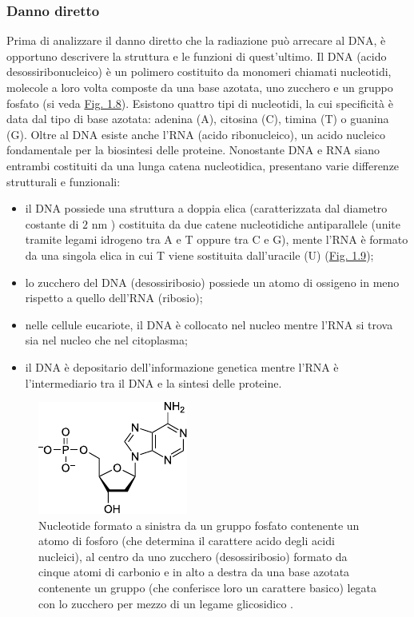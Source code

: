 \documentclass[12pt,a4paper,twoside]{report}
\begin{document}
	\subsubsection{Danno diretto}\label{par:danno_diretto}
	Prima di analizzare il danno diretto che la radiazione può arrecare al DNA, è opportuno descrivere la struttura e le funzioni di quest'ultimo. Il DNA (acido desossiribonucleico) è un polimero costituito da monomeri chiamati nucleotidi, molecole a loro volta composte da una base azotata, uno zucchero e un gruppo fosfato (si veda \hyperref[fig:nucleotide]{Fig. 1.8}). Esistono quattro tipi di nucleotidi, la cui specificità è data dal tipo di base azotata: adenina (A), citosina (C), timina (T) o guanina (G). Oltre al DNA esiste anche l'RNA (acido ribonucleico), un acido nucleico fondamentale per la biosintesi delle proteine. Nonostante DNA e RNA siano entrambi costituiti da una lunga catena nucleotidica, presentano varie differenze strutturali e funzionali:
	\begin{itemize}
		\item il DNA possiede una struttura a doppia elica (caratterizzata dal diametro costante di $2\mbox{ nm}$ \cite{campbell3anno}) costituita da due catene nucleotidiche antiparallele (unite tramite legami idrogeno tra A e T oppure tra C e G), mente l'RNA è formato da una singola elica in cui T viene sostituita dall'uracile (U) (\hyperref[fig:dna_structure]{Fig. 1.9});
		\item lo zucchero del DNA (desossiribosio) possiede un atomo di ossigeno in meno rispetto a quello dell'RNA (ribosio);
		\item nelle cellule eucariote, il DNA è collocato nel nucleo mentre l'RNA si trova sia nel nucleo che nel citoplasma;
		\item il DNA è depositario dell'informazione genetica mentre l'RNA è l'intermediario tra il DNA e la sintesi delle proteine.
	\end{itemize}
	\begin{figure}[H]
		\centering
		\includegraphics[width=0.5\linewidth]{nucleotide.pdf}
		\caption{Nucleotide formato a sinistra da un gruppo fosfato contenente un atomo di fosforo  (che determina il carattere acido degli acidi nucleici), al centro da uno zucchero (desossiribosio) formato da cinque atomi di carbonio e in alto a destra da una base azotata contenente un gruppo  (che conferisce loro un carattere basico) legata con lo zucchero per mezzo di un legame glicosidico \cite{nucleotidi_wiki}.}
		\label{fig:nucleotide}
	\end{figure}
\end{document}
